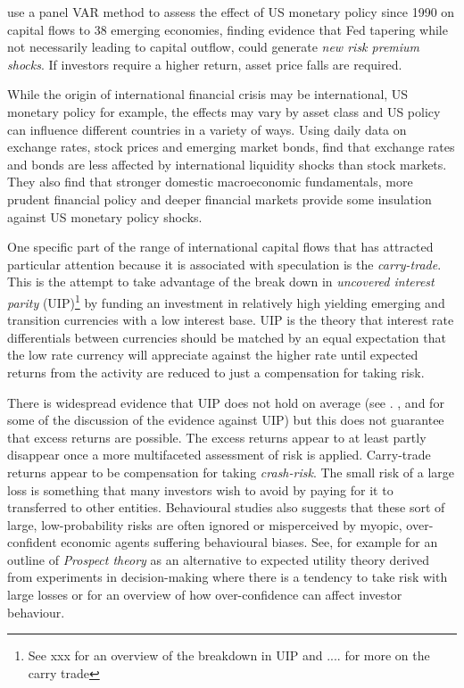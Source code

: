 \documentclass[12pt, a4paper, oneside]{article} %
\begin{document}
\citet{IMFLatam} use a panel VAR method to assess the effect of US monetary policy since 1990 on capital flows to 38 emerging economies, finding evidence that Fed tapering while not necessarily leading to capital outflow, could generate \emph{new risk premium shocks}.   If investors require a higher return, asset price falls are required. 

While the origin of international financial crisis may be international, US monetary policy for example, the effects may vary by asset class and US policy can influence different countries in a variety of ways.  Using daily data on exchange rates, stock prices and emerging market bonds, \citet{Tapering} find that exchange rates and bonds are less affected by international liquidity shocks than stock markets.  They also find that stronger domestic macroeconomic fundamentals, more prudent financial policy and deeper financial markets provide some insulation against US monetary policy shocks.

One specific part of the range of international capital flows that has attracted particular attention because it is associated with speculation is the \emph{carry-trade}.  This is the attempt to take advantage of the break down in \emph{uncovered interest parity} (UIP)\footnote{See xxx for an overview of the breakdown in UIP and .... for more on the carry trade} by funding an investment in relatively high yielding emerging and transition currencies with a low interest base.  UIP is the theory that interest rate differentials between currencies should be matched by an equal expectation that the low rate currency will appreciate against the higher rate until expected returns from the activity are reduced to just a compensation for taking risk. %

There is widespread evidence that UIP does not hold on average (see \citet{FrootAnomolies}. \citet{FrootFrankelFDB}, \citet{Hodrick1987} and \citet{SpronkEER} for some of the discussion of the evidence against UIP) but this does not guarantee that excess returns are possible.  The excess returns appear to at least partly disappear once a more multifaceted assessment of risk is applied.  Carry-trade returns appear to be compensation for taking \emph{crash-risk}.  The small risk of a large loss is something that many investors wish to avoid by paying for it to transferred to other entities.   Behavioural studies also suggests that these sort of large, low-probability risks are often ignored or misperceived by myopic, over-confident economic agents suffering behavioural biases. See, for example \citet{Kahneman1979Prospect} for an outline of \emph{Prospect theory} as an alternative to expected utility theory derived from experiments in decision-making where there is a tendency to take risk with large losses or \citet{odean1998volume} for an overview of how over-confidence can affect investor behaviour.  
\end{document}
